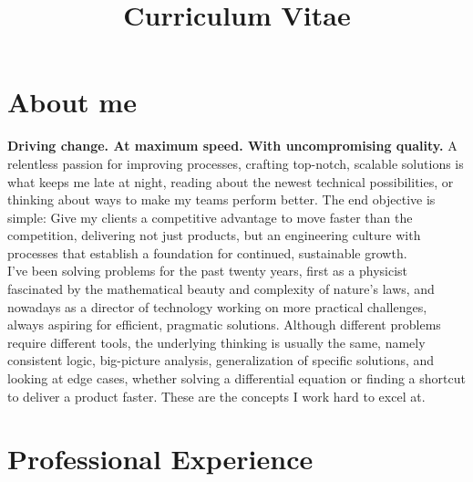 \documentclass[11pt,a4paper,sans]{moderncv}        %
\title{Curriculum Vitae}                               %
\begin{document}
\makecvtitle

\section{About me}

\textbf{Driving change. At maximum speed. With uncompromising quality.} A relentless passion for improving processes, crafting top-notch, scalable solutions is
what keeps me late at night, reading about the newest technical possibilities, or thinking about ways to make my teams perform better. The end objective is simple: Give my clients a competitive advantage to move
faster than the competition, delivering not just products, but an engineering culture with processes that establish a foundation for continued, sustainable growth. \\

I've been solving problems for the past twenty years, first as a physicist fascinated by the mathematical beauty and complexity of nature's laws, and nowadays as a director of technology
working on more practical challenges, always aspiring for efficient, pragmatic solutions. Although different problems require different tools, the underlying thinking
is usually the same, namely consistent logic, big-picture analysis, generalization of specific solutions, and looking at edge cases, whether solving a
differential equation or finding a shortcut to deliver a product faster. These are the concepts I work hard to excel at.

\nopagebreak[4]

\section{Professional Experience}


\end{document}
